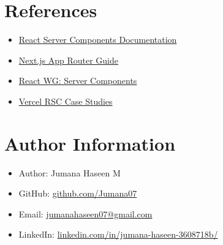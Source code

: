 \documentclass[12pt]{article}
\begin{document}
\section*{References}
\begin{itemize}
    \item \href{https://react.dev/learn/server-components}{React Server Components Documentation}
    \item \href{https://nextjs.org/docs/app}{Next.js App Router Guide}
    \item \href{https://github.com/reactwg/server-components}{React WG: Server Components}
    \item \href{https://vercel.com/blog}{Vercel RSC Case Studies}
\end{itemize}

\section*{Author Information}
\begin{itemize}
    \item Author: Jumana Haseen M
    \item GitHub: \href{https://github.com/Jumana07}{github.com/Jumana07}
    \item Email: \href{mailto:jumanahaseen07@gmail.com}{jumanahaseen07@gmail.com}
    \item LinkedIn: \href{https://www.linkedin.com/in/jumana-haseen-3608718b/}{linkedin.com/in/jumana-haseen-3608718b/}
\end{itemize}
\end{document}
